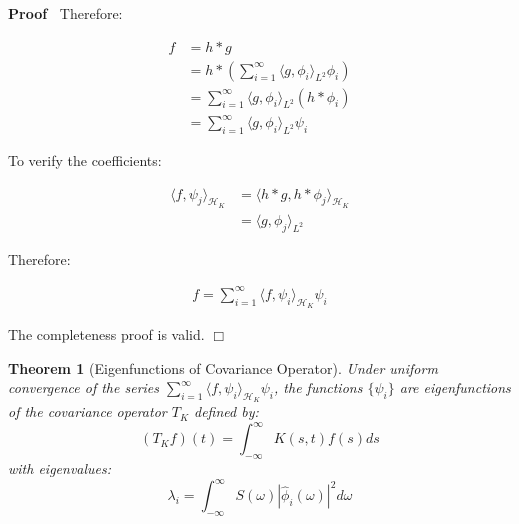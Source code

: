 \documentclass{article}
\newcommand{\tmcolor}[2]{{\color{#1}{#2}}}
\newenvironment{proof}{\noindent\textbf{Proof\ }}{\hspace*{\fill}$\Box$\medskip}
\newtheorem{theorem}{Theorem}
\begin{document}
\begin{proof}
  Therefore:
  
  \begin{align}
    f & = h \ast g \\
    & = h \ast \left( \sum_{i = 1}^{\infty} \langle g, \phi_i \rangle_{L^2}
    \phi_i \right) \\
    & = \sum_{i = 1}^{\infty} \langle g, \phi_i \rangle_{L^2}  (h \ast
    \phi_i) \\
    & = \sum_{i = 1}^{\infty} \langle g, \phi_i \rangle_{L^2} \psi_i 
  \end{align}
  
  To verify the coefficients:
  
  \begin{align}
    \langle f, \psi_j \rangle_{\mathcal{H}_K} & = \langle h \ast g, h \ast
    \phi_j \rangle_{\mathcal{H}_K} \\
    & = \langle g, \phi_j \rangle_{L^2} 
  \end{align}
  
  Therefore:
  
  \begin{align}
    f = \sum_{i = 1}^{\infty} \langle f, \psi_i \rangle_{\mathcal{H}_K} \psi_i
    
  \end{align}
  
  \tmcolor{green}{{\checkmark}} The completeness proof is valid.
\end{proof}

\begin{theorem}
  [Eigenfunctions of Covariance Operator] Under uniform convergence of the
  series $\sum_{i = 1}^{\infty} \langle f, \psi_i \rangle_{\mathcal{H}_K}
  \psi_i$, the functions $\{\psi_i \}$ are eigenfunctions of the covariance
  operator $T_K$ defined by:
  \[ (T_K f) (t) = \int_{- \infty}^{\infty} K (s, t) f (s) ds \]
  with eigenvalues:
  \[ \lambda_i = \int_{- \infty}^{\infty} S (\omega) | \hat{\phi}_i (\omega)
     |^2 d \omega \]
\end{theorem}
\end{document}
